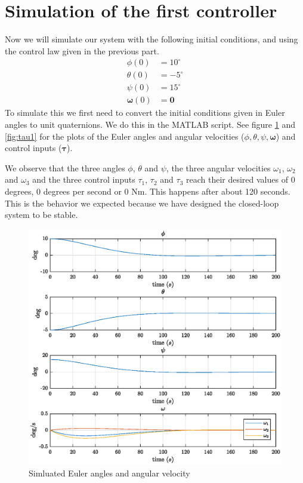 \section{Simulation of the first controller}
Now we will simulate our system with the following initial conditions, and using the control law given in the previous part.
\begin{equation*}
    \begin{split}
        \phi(0) &= 10^{\circ} \\
        \theta(0) &= -5^{\circ} \\
        \psi(0) &= 15^{\circ} \\
        \boldsymbol{\omega}(0) &= \mathbf{0}
    \end{split}
\end{equation*}
To simulate this we first need to convert the initial conditions given in Euler angles to unit quaternions. We do this in the MATLAB script. See figure \ref{fig:eulang1} and \ref{fig:tau1} for the plots of the Euler angles and angular velocities ($\phi, \theta, \psi, \boldsymbol{\omega}$) and control inputs ($\boldsymbol{\tau}$).

We observe that the three angles $\phi$, $\theta$ and $\psi$, the three angular velocities $\omega_1$, $\omega_2$ and $\omega_3$ and the three control inputs $\tau_1$, $\tau_2$ and $\tau_3$ reach their desired values of 0 degrees, 0 degrees per second or 0 Nm. This happens after about 120 seconds. This is the behavior we expected because we have designed the closed-loop system to be stable.


\begin{figure}[h!]
    \centering
    \includegraphics[scale=0.75]{eulang1.eps}
    \caption{Simluated Euler angles and angular velocity}
    \label{fig:eulang1}
\end{figure}


